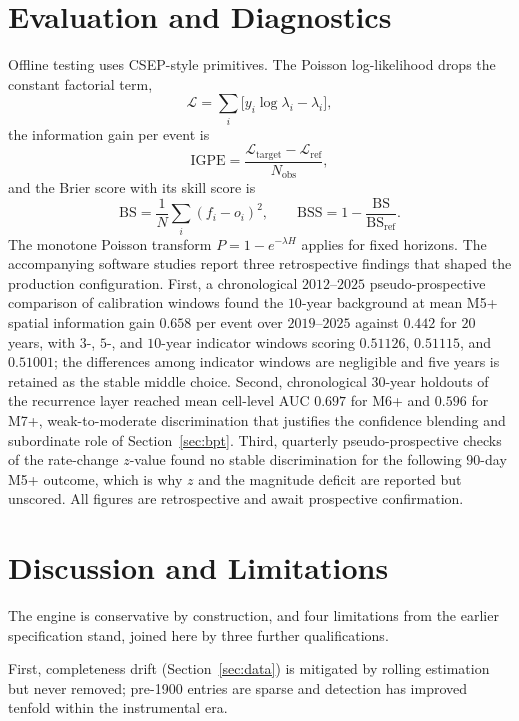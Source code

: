 \documentclass[11pt,a4paper]{article}
\begin{document}
\section{Evaluation and Diagnostics}\label{sec:eval}
Offline testing uses CSEP-style primitives. The Poisson log-likelihood
drops the constant factorial term,
\begin{equation}
\mathcal{L}=\sum_i\big[y_i\log\lambda_i-\lambda_i\big],
\end{equation}
the information gain per event is
\begin{equation}
\mathrm{IGPE}=
\frac{\mathcal{L}_{\text{target}}-\mathcal{L}_{\text{ref}}}{N_{\text{obs}}},
\end{equation}
and the Brier score with its skill score is
\begin{equation}
\mathrm{BS}=\frac{1}{N}\sum_i(f_i-o_i)^2,\qquad
\mathrm{BSS}=1-\frac{\mathrm{BS}}{\mathrm{BS}_{\text{ref}}}.
\end{equation}
The monotone Poisson transform $P=1-e^{-\lambda H}$ applies for fixed
horizons. The accompanying
software studies report three retrospective findings that shaped the
production configuration. First, a chronological $2012$--$2025$
pseudo-prospective comparison of calibration windows found the $10$-year
background at mean M5+ spatial information gain $0.658$ per event over
$2019$--$2025$ against $0.442$ for $20$ years, with $3$-, $5$-, and
$10$-year indicator windows scoring $0.51126$, $0.51115$, and $0.51001$;
the differences among indicator windows are negligible and five years is
retained as the stable middle choice. Second, chronological $30$-year
holdouts of the recurrence layer reached mean cell-level AUC $0.697$ for
M6+ and $0.596$ for M7+, weak-to-moderate discrimination that justifies the
confidence blending and subordinate role of Section~\ref{sec:bpt}. Third,
quarterly pseudo-prospective checks of the rate-change $z$-value found no
stable discrimination for the following $90$-day M5+ outcome, which is why
$z$ and the magnitude deficit are reported but unscored. All figures are
retrospective and await prospective confirmation.

\section{Discussion and Limitations}\label{sec:discussion}
The engine is conservative by construction, and four limitations from the
earlier specification stand, joined here by three further qualifications.

First, completeness drift (Section~\ref{sec:data}) is mitigated by rolling
estimation but never removed; pre-1900 entries are sparse and detection has
improved tenfold within the instrumental era.
\end{document}
